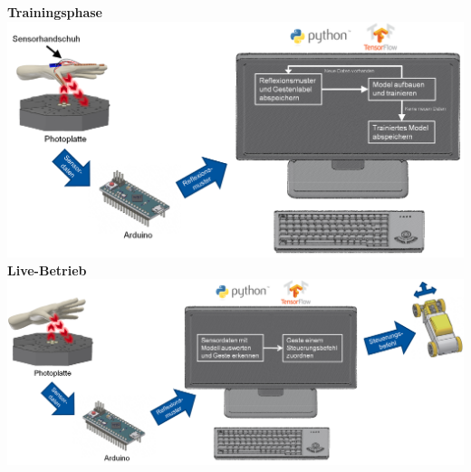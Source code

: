 \documentclass{sciposter}
\begin{document}
\begin{multicols}{3}
\noindent
	\centering
\textbf{Trainingsphase}\\
\includegraphics[scale=0.7]{../figures/Anlernphase.png}
\noindent
\textbf{Live-Betrieb}\\
\includegraphics[scale=0.7]{../figures/LiveBetrieb.png}

%
%
%	
%	
%



\end{multicols}
\end{document}
